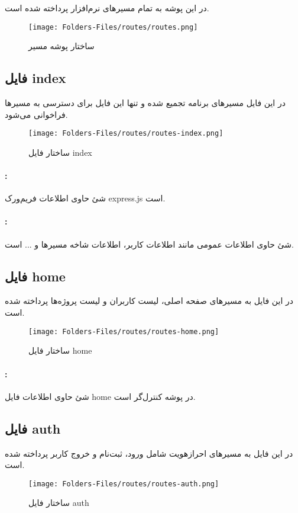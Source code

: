 
در این پوشه به تمام مسیر‌های نرم‌افزار پرداخته شده است.
\begin{figure}[H]
	\texttt{[image: Folders-Files/routes/routes.png]}
	\centering
	\caption{ساختار پوشه مسیر}
	\label{fig:folder:routes}
\end{figure}

\subsection{فایل index}
در این فایل مسیرهای برنامه تجمیع شده و تنها این فایل برای دسترسی به مسیرها فراخوانی می‌شود.
\begin{figure}[H]
	\texttt{[image: Folders-Files/routes/routes-index.png]}
	\centering
	\caption{ساختار فایل index}
	\label{fig:file:routes:index}
\end{figure}
\paragraph{:}
شئ حاوی اطلاعات فریم‌ورک express.js است.
\paragraph{:}
شئ حاوی اطلاعات عمومی مانند اطلاعات کاربر، اطلاعات شاخه مسیرها و ... است.

\subsection{فایل home}
در این فایل به مسیرهای صفحه اصلی، لیست کاربران و لیست پروژه‌ها پرداخته شده است.
\begin{figure}[H]
	\texttt{[image: Folders-Files/routes/routes-home.png]}
	\centering
	\caption{ساختار فایل home}
	\label{fig:file:routes:home}
\end{figure}
\paragraph{:}
شئ حاوی اطلاعات فایل home در پوشه کنترل‌گر است.

\subsection{فایل auth}
در این فایل به مسیرهای احرازهویت شامل ورود، ثبت‌نام و خروج کاربر پرداخته شده است.
\begin{figure}[H]
	\texttt{[image: Folders-Files/routes/routes-auth.png]}
	\centering
	\caption{ساختار فایل auth}
	\label{fig:file:routes:auth}
\end{figure}
